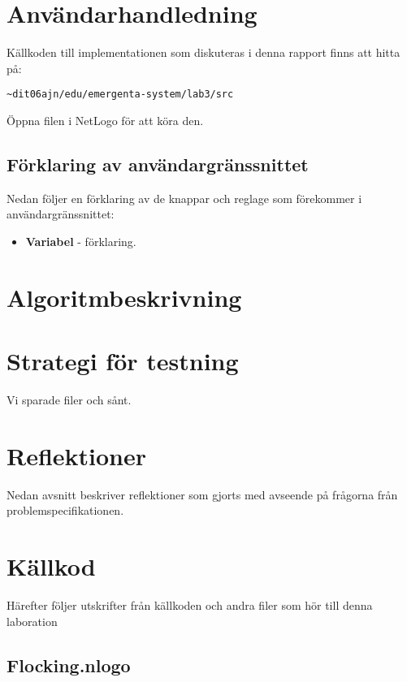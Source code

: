 \documentclass[titlepage, a4paper, 12pt]{article}
\begin{document}
\section{Användarhandledning}
Källkoden till implementationen som diskuteras i denna rapport finns
att hitta på:

\verb!~dit06ajn/edu/emergenta-system/lab3/src!

Öppna filen i NetLogo för att köra den.

\subsection{Förklaring av användargränssnittet}
Nedan följer en förklaring av de knappar och reglage som förekommer i
användargränssnittet:

\begin{itemize}
\item \textbf{Variabel} - förklaring.
\end{itemize}

\section{Algoritmbeskrivning}

\section{Strategi för testning}
Vi sparade filer och sånt.

\section{Reflektioner}\label{sec:reflektioner}

Nedan avsnitt beskriver reflektioner som gjorts med avseende på
frågorna från problemspecifikationen.

    
    
    

\newpage
\appendix
{}
\section{Källkod}\label{sec:kallkod}
Härefter följer utskrifter från källkoden och andra filer som hör till
denna laboration

\subsection{Flocking.nlogo}\label{app:Flocking.nlogo}
\begin{footnotesize}
  
\end{footnotesize}
\end{document}

